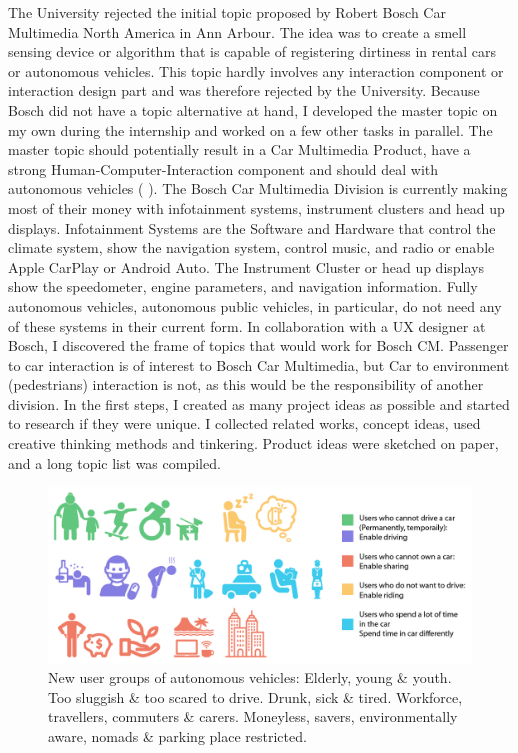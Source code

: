 The University rejected the initial topic proposed by Robert Bosch Car Multimedia North America in Ann Arbour. The idea was to create a smell sensing device or algorithm that is capable of registering dirtiness in rental cars or autonomous vehicles. This topic hardly involves any interaction component or interaction design part and was therefore rejected by the University. Because Bosch did not have a topic alternative at hand, I developed the master topic on my own during the internship and worked on a few other tasks in parallel. The master topic should potentially result in a Car Multimedia Product, have a strong Human-Computer-Interaction component and should deal with autonomous vehicles ( ). The Bosch Car Multimedia Division is currently making most of their money with infotainment systems, instrument clusters and head up displays. Infotainment Systems are the Software and Hardware that control the climate system, show the navigation system, control music, and radio or enable Apple CarPlay or Android Auto. The Instrument Cluster or head up displays show the speedometer, engine parameters, and navigation information. Fully autonomous vehicles, autonomous public vehicles, in particular, do not need any of these systems in their current form. In collaboration with a UX designer at Bosch, I discovered the frame of topics that would work for Bosch CM. Passenger to car interaction is of interest to Bosch Car Multimedia, but Car to environment (pedestrians) interaction is not, as this would be the responsibility of another division. In the first steps, I created as many project ideas as possible and started to research if they were unique. I collected related works, concept ideas, used creative thinking methods and tinkering. Product ideas were sketched on paper, and a long topic list was compiled. 
\begin{figure}
    \includegraphics[width=1\textwidth]{fig/users.png}
    \caption[Users]{New user groups of autonomous vehicles: Elderly, young \& youth. Too sluggish \& too scared to drive. Drunk, sick \& tired. Workforce, travellers, commuters \& carers. Moneyless, savers, environmentally aware, nomads \& parking place restricted.}
    \label{fig:users}
\end{figure}


